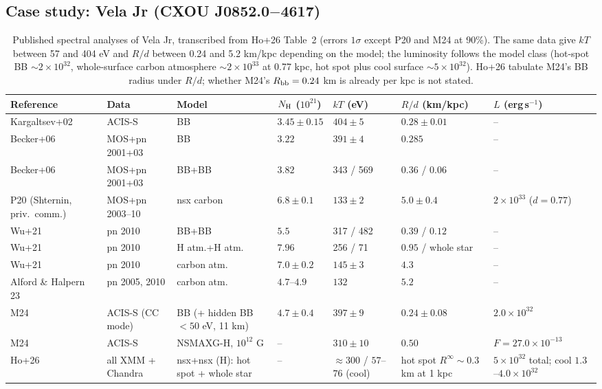 \documentclass[11pt,a4paper]{article}
\begin{document}
\subsection{Case study: Vela Jr (CXOU J0852.0$-$4617)}\label{sec:vela}
\begin{table}[htbp]
\centering\scriptsize
\caption{Published spectral analyses of Vela Jr, transcribed from Ho+26 Table~2 (errors $1\sigma$ except P20 and M24 at 90\%). The same data give $kT$ between 57 and 404 eV and $R/d$ between 0.24 and 5.2 km/kpc depending on the model; the luminosity follows the model class (hot-spot BB $\sim2\times10^{32}$, whole-surface carbon atmosphere $\sim2\times10^{33}$ at 0.77 kpc, hot spot plus cool surface $\sim5\times10^{32}$). Ho+26 tabulate M24's BB radius under $R/d$; whether M24's $R_{\rm bb}=0.24$ km is already per kpc is not stated.}\label{tab:vela}
\begin{adjustbox}{max width=\textwidth}\begin{tabular}{P{2.2cm}P{2.3cm}P{2.8cm}P{1.3cm}P{2.0cm}P{2.4cm}P{2.8cm}}
\toprule
Reference & Data & Model & $N_{\rm H}$ ($10^{21}$) & $kT$ (eV) & $R/d$ (km/kpc) & $L$ (erg\,s$^{-1}$)\\
\midrule
Kargaltsev+02 & ACIS-S & BB & $3.45\pm0.15$ & $404\pm5$ & $0.28\pm0.01$ & --\\
Becker+06 & MOS+pn 2001+03 & BB & $3.22$ & $391\pm4$ & $0.285$ & --\\
Becker+06 & MOS+pn 2001+03 & BB+BB & $3.82$ & 343 / 569 & $0.36$ / $0.06$ & --\\
P20 (Shternin, priv.\ comm.) & MOS+pn 2003--10 & nsx carbon & $6.8\pm0.1$ & $133\pm2$ & $5.0\pm0.4$ & $2\times10^{33}$ ($d=0.77$)\\
Wu+21 & pn 2010 & BB+BB & $5.5$ & 317 / 482 & $0.39$ / $0.12$ & --\\
Wu+21 & pn 2010 & H atm.+H atm. & $7.96$ & 256 / 71 & $0.95$ / whole star & --\\
Wu+21 & pn 2010 & carbon atm. & $7.0\pm0.2$ & $145\pm3$ & $4.3$ & --\\
Alford \& Halpern 23 & pn 2005, 2010 & carbon atm. & $4.7$--$4.9$ & $132$ & $5.2$ & --\\
M24 & ACIS-S (CC mode) & BB (+ hidden BB $<50$ eV, 11 km) & $4.7\pm0.4$ & $397\pm9$ & $0.24\pm0.08$ & $2.0\times10^{32}$\\
M24 & ACIS-S & NSMAXG-H, $10^{12}$ G & -- & $310\pm10$ & $0.50$ & $F=27.0\times10^{-13}$\\
Ho+26 & all XMM + Chandra & nsx+nsx (H): hot spot + whole star & -- & $\approx300$ / $57$--$76$ (cool) & hot spot $R^\infty\sim0.3$ km at 1 kpc & $5\times10^{32}$ total; cool $1.3$--$4.0\times10^{32}$\\
\bottomrule
\end{tabular}\end{adjustbox}
\end{table}
\end{document}
